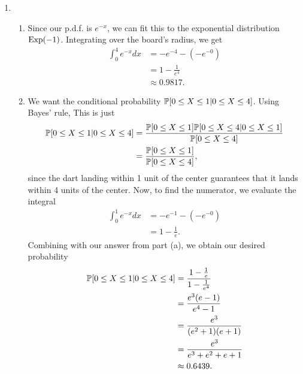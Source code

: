 \begin{enumerate}
    \item \begin{enumerate}
        \item Since our p.d.f. is $e^{-x}$, we can fit this to the exponential distribution $\f{Exp}(-1)$. Integrating over the board's radius, we get
        \begin{align*}
            \int_0^4e^{-x}dx &= -e^{-4} - (-e^{-0}) \\
                &= 1 - \frac{1}{e^4} \\
                &\approx 0.9817.
        \end{align*}
        
        \item We want the conditional probability $\P[0 \leq X \leq 1 | 0 \leq X \leq 4]$. Using Bayes' rule, This is just
        \begin{align*}
            \P[0 \leq X \leq 1 | 0 \leq X \leq 4] &= \frac{\P[0 \leq X \leq 1]\P[0 \leq X \leq 4 | 0 \leq X \leq 1]}{\P[0 \leq X \leq 4]} \\
                &= \frac{\P[0 \leq X \leq 1]}{\P[0 \leq X \leq 4]},
        \end{align*}
        since the dart landing within 1 unit of the center guarantees that it lands within 4 units of the center. Now, to find the numerator, we evaluate the integral
        \begin{align*}
            \int_0^1e^{-x}dx &= -e^{-1} - (-e^{-0}) \\
                &= 1 - \frac{1}{e}.
        \end{align*}
        Combining with our answer from part (a), we obtain our desired probability
        \begin{align*}
            \P[0 \leq X \leq 1 | 0 \leq X \leq 4] &= \frac{1 - \frac{1}{e}}{1 - \frac{1}{e^4}} \\
                &= \frac{e^3(e - 1)}{e^4 - 1} \\
                &= \frac{e^3}{(e^2+1)(e+1)} \\
                &= \frac{e^3}{e^3+e^2+e+1} \\
                &\approx 0.6439.
        \end{align*}
        

\end{enumerate}
\end{enumerate}

